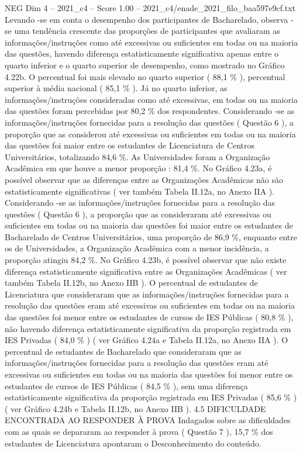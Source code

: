 \begin{textsample}{NEG Dim 4 – 2021\_c4 – Score 1.00 – 2021\_c4/enade\_2021\_filo\_baa597e9cf.txt}
Levando -se em conta o desempenho dos participantes de Bacharelado, observa -se uma tendência crescente das proporções de participantes que avaliaram as informações/instruções como até excessivas ou suficientes em todas ou na maioria das questões, havendo diferença estatisticamente significativa apenas entre o quarto inferior e o quarto superior de desempenho, como mostrado no Gráfico 4.22b.
O percentual foi mais elevado no quarto superior ( 88,1 \% ), percentual superior à média nacional ( 85,1 \% ).
Já no quarto inferior, as informações/instruções consideradas como até excessivas, em todas ou na maioria das questões foram percebidas por 80,2 \% dos respondentes.
Considerando -se as informações/instruções fornecidas para a resolução das questões ( Questão 6 ), a proporção que as considerou até excessivas ou suficientes em todas ou na maioria das questões foi maior entre os estudantes de Licenciatura de Centros Universitários, totalizando 84,6 \%.
As Universidades foram a Organização Acadêmica em que houve a menor proporção : 81,4 \%.
No Gráfico 4.23a, é possível observar que as diferenças entre as Organizações Acadêmicas não são estatisticamente significativas ( ver também Tabela II.12a, no Anexo IIA ).
Considerando -se as informações/instruções fornecidas para a resolução das questões ( Questão 6 ), a proporção que as consideraram até excessivas ou suficientes em todas ou na maioria das questões foi maior entre os estudantes de Bacharelado de Centros Universitários, uma proporção de 86,9 \%, enquanto entre os de Universidades, a Organização Acadêmica com a menor incidência, a proporção atingiu 84,2 \%.
No Gráfico 4.23b, é possível observar que não existe diferença estatisticamente significativa entre as Organizações Acadêmicas ( ver também Tabela II.12b, no Anexo IIB ).
O percentual de estudantes de Licenciatura que consideraram que as informações/instruções fornecidas para a resolução das questões eram até excessivas ou suficientes em todas ou na maioria das questões foi menor entre os estudantes de cursos de IES Públicas ( 80,8 \% ), não havendo diferença estatisticamente significativa da proporção registrada em IES Privadas ( 84,0 \% ) ( ver Gráfico 4.24a e Tabela II.12a, no Anexo IIA ).
O percentual de estudantes de Bacharelado que consideraram que as informações/instruções fornecidas para a resolução das questões eram até excessivas ou suficientes em todas ou na maioria das questões foi menor entre os estudantes de cursos de IES Públicas ( 84,5 \% ), sem uma diferença estatisticamente significativa da proporção registrada em IES Privadas ( 85,6 \% ) ( ver Gráfico 4.24b e Tabela II.12b, no Anexo IIB ). 4.5 DIFICULDADE ENCONTRADA AO RESPONDER À PROVA Indagados sobre as dificuldades com as quais se depararam ao responder à prova ( Questão 7 ), 15,7 \% dos estudantes de Licenciatura apontaram o Desconhecimento do conteúdo.

\end{textsample}
